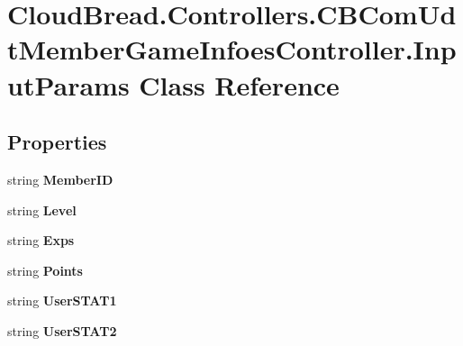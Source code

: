 \hypertarget{a00099}{}\section{Cloud\+Bread.\+Controllers.\+C\+B\+Com\+Udt\+Member\+Game\+Infoes\+Controller.\+Input\+Params Class Reference}
\label{a00099}
\subsection*{Properties}
\begin{DoxyCompactItemize}
\item 
string {\bfseries Member\+ID}\hypertarget{a00099_a9a70f01709d151bfbc05a30d744bffc4}{}\label{a00099_a9a70f01709d151bfbc05a30d744bffc4}

\item 
string {\bfseries Level}\hypertarget{a00099_ab7493b51b92fa1174b7cfb7d368e0e10}{}\label{a00099_ab7493b51b92fa1174b7cfb7d368e0e10}

\item 
string {\bfseries Exps}\hypertarget{a00099_a138ecd4302575c63e690afe3fc0ded97}{}\label{a00099_a138ecd4302575c63e690afe3fc0ded97}

\item 
string {\bfseries Points}\hypertarget{a00099_aab79d983babaa8c4c3cf75913752d7c2}{}\label{a00099_aab79d983babaa8c4c3cf75913752d7c2}

\item 
string {\bfseries User\+S\+T\+A\+T1}\hypertarget{a00099_a45541763be518598705e7a09a29834cc}{}\label{a00099_a45541763be518598705e7a09a29834cc}

\item 
string {\bfseries User\+S\+T\+A\+T2}\hypertarget{a00099_a232d52b29f135a153c630f4b92228c3b}{}\label{a00099_a232d52b29f135a153c630f4b92228c3b}


\end{DoxyCompactItemize}
